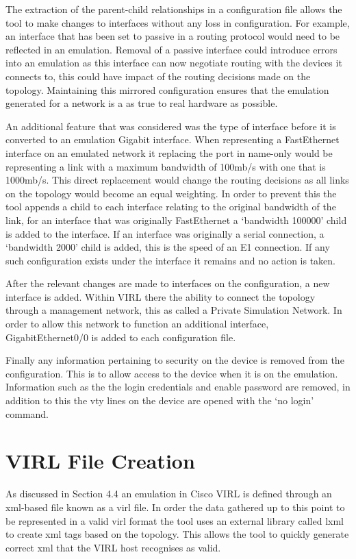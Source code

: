 \documentclass[11pt]{report}
\begin{document}
The extraction of the parent-child relationships in a configuration file allows the tool to make changes to interfaces without any loss in configuration. For example, an interface that has been set to passive in a routing protocol would need to be reflected in an emulation. Removal of a passive interface could introduce errors into an emulation as this interface can now negotiate routing with the devices it connects to, this could have impact of the routing decisions made on the topology. Maintaining this mirrored configuration ensures that the emulation generated for a network is a as true to real hardware as possible.

An additional feature that was considered was the type of interface before it is converted to an emulation Gigabit interface. When representing a FastEthernet interface on an emulated network it replacing the port in name-only would be representing a link with a maximum bandwidth of 100mb/s with one that is 1000mb/s. This direct replacement would change the routing decisions as all links on the topology would become an equal weighting. In order to prevent this the tool appends a child to each interface relating to the original bandwidth of the link, for an interface that was originally FastEthernet a `bandwidth 100000' child is added to the interface. If an interface was originally a serial connection, a `bandwidth 2000' child is added, this is the speed of an E1 connection. If any such configuration exists under the interface it remains and no action is taken.

After the relevant changes are made to interfaces on the configuration, a new interface is added. Within VIRL there the ability to connect the topology through a management network, this as called a Private Simulation Network. In order to allow this network to function an additional interface, GigabitEthernet0/0 is added to each configuration file.

Finally any information pertaining to security on the device is removed from the configuration. This is to allow access to the device when it is on the emulation. Information such as the the login credentials and enable password are removed, in addition to this the vty lines on the device are opened with the `no login' command.

\section{VIRL File Creation}

As discussed in Section 4.4 an emulation in Cisco VIRL is defined through an xml-based file known as a virl file. In order the data gathered up to this point to be represented in a valid virl format the tool uses an external library called lxml \citep{lxml} to create xml tags based on the topology. This allows the tool to quickly generate correct xml that the VIRL host recognises as valid.
\end{document}
